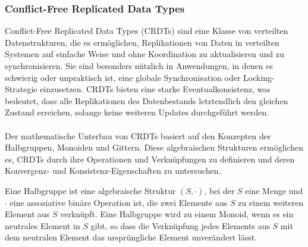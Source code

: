 \subsubsection{Conflict-Free Replicated Data Types}
Conflict-Free Replicated Data Types (CRDTs) sind eine Klasse von verteilten Datenstrukturen, die es ermöglichen, Replikationen von Daten in verteilten Systemen auf einfache Weise und ohne Koordination zu aktualisieren und zu synchronisieren. Sie sind besonders nützlich in Anwendungen, in denen es schwierig oder unpraktisch ist, eine globale Synchronisation oder Locking-Strategie einzusetzen. CRDTs bieten eine starke Eventualkonsistenz, was bedeutet, dass alle Replikationen des Datenbestands letztendlich den gleichen Zustand erreichen, solange keine weiteren Updates durchgeführt werden.
\\\\
Der mathematische Unterbau von CRDTs basiert auf den Konzepten der Halbgruppen, Monoiden und Gittern. Diese algebraischen Strukturen ermöglichen es, CRDTs durch ihre Operationen und Verknüpfungen zu definieren und deren Konvergenz- und Konsistenz-Eigenschaften zu untersuchen.

Eine Halbgruppe ist eine algebraische Struktur $(S, \cdot)$, bei der $S$ eine Menge und $\cdot$ eine assoziative binäre Operation ist, die zwei Elemente aus $S$ zu einem weiteren Element aus $S$ verknüpft. Eine Halbgruppe wird zu einem Monoid, wenn es ein neutrales Element in $S$ gibt, so dass die Verknüpfung jedes Elements aus $S$ mit dem neutralen Element das ursprüngliche Element unverändert lässt.

